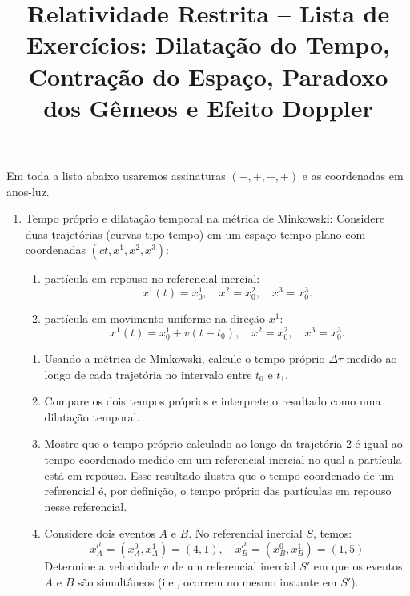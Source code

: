 \newif\ifuseseminar
\useseminartrue


\title{Relatividade Restrita -- Lista de Exercícios: Dilatação do Tempo, Contração do Espaço, Paradoxo dos Gêmeos e Efeito Doppler}



Em toda a lista abaixo usaremos assinaturas $(-,+,+,+)$ e as coordenadas em anos-luz.

\begin{enumerate}

      \item Tempo próprio e dilatação temporal na métrica de Minkowski: Considere duas
            trajetórias (curvas tipo-tempo) em um espaço-tempo plano com coordenadas
            $(ct, x^1, x^2, x^3)$:

            \begin{enumerate}
                  \item[Trajetória 1] partícula em repouso no referencial inercial:
                        $$x^1(t) = x^1_0,\quad x^2 = x^2_0,\quad x^3 = x^3_0.$$

                  \item[Trajetória 2] partícula em movimento uniforme na direção $x^1$:
                        $$x^1(t) = x^1_0 + v(t - t_0),\quad x^2 = x^2_0, \quad x^3 = x^3_0.$$
            \end{enumerate}

            \begin{enumerate}
                  \item Usando a métrica de Minkowski, calcule o tempo próprio
                        $\Delta \tau$ medido ao longo de cada trajetória no intervalo entre
                        $t_0$ e $t_1$.
                  \item Compare os dois tempos próprios e interprete o resultado como
                        uma dilatação temporal.
                  \item Mostre que o tempo próprio calculado ao longo da trajetória 2 é
                        igual ao tempo coordenado medido em um referencial inercial no qual a
                        partícula está em repouso. Esse resultado ilustra que o tempo
                        coordenado de um referencial é, por definição, o tempo próprio das
                        partículas em repouso nesse referencial.
                  \item Considere dois eventos $A$ e $B$. No referencial inercial $S$,
                        temos:
                        $$
                              x_A^\mu = (x^0_A, x^1_A) = (4, 1), \quad
                              x_B^\mu = (x^0_B, x^1_B) = (1, 5)
                        $$
                        Determine a velocidade $v$ de um referencial inercial $S'$ em
                        que os eventos $A$ e $B$ são simultâneos (i.e., ocorrem no mesmo
                        instante em $S'$).
            \end{enumerate}


\end{enumerate}
